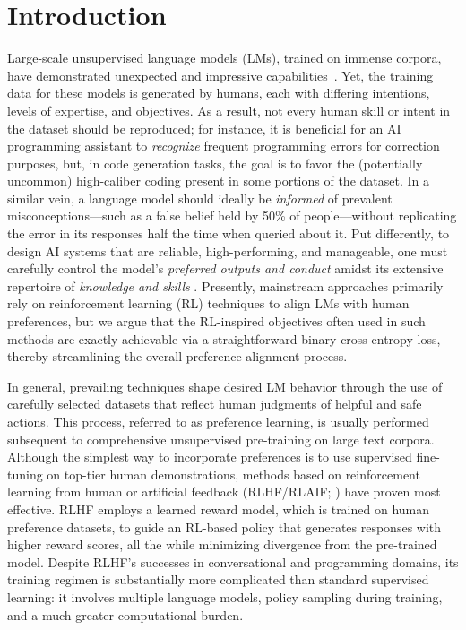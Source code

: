 \section{Introduction}
Large-scale unsupervised language models (LMs), trained on immense corpora, have demonstrated unexpected and impressive capabilities~\citep{chowdhery2022palm, brown2020language, touvron2023llama,bubeck2023sparks}. Yet, the training data for these models is generated by humans, each with differing intentions, levels of expertise, and objectives. As a result, not every human skill or intent in the dataset should be reproduced; for instance, it is beneficial for an AI programming assistant to \textit{recognize} frequent programming errors for correction purposes, but, in code generation tasks, the goal is to favor the (potentially uncommon) high-caliber coding present in some portions of the dataset. In a similar vein, a language model should ideally be \textit{informed} of prevalent misconceptions—such as a false belief held by 50\% of people—without replicating the error in its responses half the time when queried about it. Put differently, to design AI systems that are reliable, high-performing, and manageable, one must carefully control the model's \emph{preferred outputs and conduct} amidst its extensive repertoire of \textit{knowledge and skills} \citep{ouyang2022training}. Presently, mainstream approaches primarily rely on reinforcement learning (RL) techniques to align LMs with human preferences, but we argue that the RL-inspired objectives often used in such methods are exactly achievable via a straightforward binary cross-entropy loss, thereby streamlining the overall preference alignment process.

In general, prevailing techniques shape desired LM behavior through the use of carefully selected datasets that reflect human judgments of helpful and safe actions. This process, referred to as preference learning, is usually performed subsequent to comprehensive unsupervised pre-training on large text corpora. Although the simplest way to incorporate preferences is to use supervised fine-tuning on top-tier human demonstrations, methods based on reinforcement learning from human or artificial feedback (RLHF/RLAIF; \citep{christiano2017deep,bai2022constitutional}) have proven most effective. RLHF employs a learned reward model, which is trained on human preference datasets, to guide an RL-based policy that generates responses with higher reward scores, all the while minimizing divergence from the pre-trained model. Despite RLHF’s successes in conversational and programming domains, its training regimen is substantially more complicated than standard supervised learning: it involves multiple language models, policy sampling during training, and a much greater computational burden.

